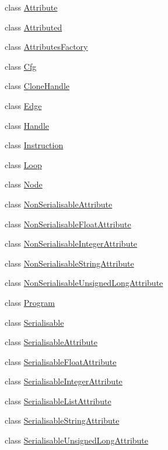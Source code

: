 \begin{DoxyCompactItemize}
\item 
class \hyperlink{classcfglib_1_1Attribute}{Attribute}
\item 
class \hyperlink{classcfglib_1_1Attributed}{Attributed}
\item 
class \hyperlink{classcfglib_1_1AttributesFactory}{Attributes\+Factory}
\item 
class \hyperlink{classcfglib_1_1Cfg}{Cfg}
\item 
class \hyperlink{classcfglib_1_1CloneHandle}{Clone\+Handle}
\item 
class \hyperlink{classcfglib_1_1Edge}{Edge}
\item 
class \hyperlink{classcfglib_1_1Handle}{Handle}
\item 
class \hyperlink{classcfglib_1_1Instruction}{Instruction}
\item 
class \hyperlink{classcfglib_1_1Loop}{Loop}
\item 
class \hyperlink{classcfglib_1_1Node}{Node}
\item 
class \hyperlink{classcfglib_1_1NonSerialisableAttribute}{Non\+Serialisable\+Attribute}
\item 
class \hyperlink{classcfglib_1_1NonSerialisableFloatAttribute}{Non\+Serialisable\+Float\+Attribute}
\item 
class \hyperlink{classcfglib_1_1NonSerialisableIntegerAttribute}{Non\+Serialisable\+Integer\+Attribute}
\item 
class \hyperlink{classcfglib_1_1NonSerialisableStringAttribute}{Non\+Serialisable\+String\+Attribute}
\item 
class \hyperlink{classcfglib_1_1NonSerialisableUnsignedLongAttribute}{Non\+Serialisable\+Unsigned\+Long\+Attribute}
\item 
class \hyperlink{classcfglib_1_1Program}{Program}
\item 
class \hyperlink{classcfglib_1_1Serialisable}{Serialisable}
\item 
class \hyperlink{classcfglib_1_1SerialisableAttribute}{Serialisable\+Attribute}
\item 
class \hyperlink{classcfglib_1_1SerialisableFloatAttribute}{Serialisable\+Float\+Attribute}
\item 
class \hyperlink{classcfglib_1_1SerialisableIntegerAttribute}{Serialisable\+Integer\+Attribute}
\item 
class \hyperlink{classcfglib_1_1SerialisableListAttribute}{Serialisable\+List\+Attribute}
\item 
class \hyperlink{classcfglib_1_1SerialisableStringAttribute}{Serialisable\+String\+Attribute}
\item 
class \hyperlink{classcfglib_1_1SerialisableUnsignedLongAttribute}{Serialisable\+Unsigned\+Long\+Attribute}
\end{DoxyCompactItemize}
